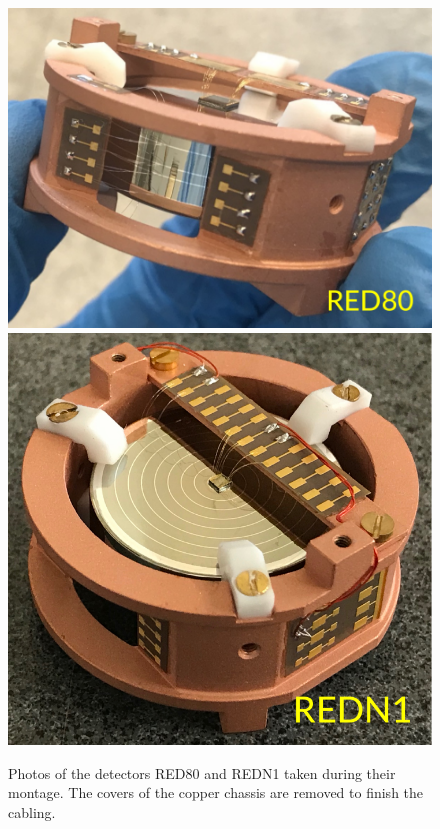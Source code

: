 \begin{figure}
\centering
\includegraphics[align=c, scale=0.5]{Figures/ElectrodesExperimental/photo_red80_v2.pdf}
\includegraphics[align=c, scale=0.5]{Figures/ElectrodesExperimental/photo_redn1_v2.pdf}
\caption{Photos of the detectors RED80 and REDN1 taken during their montage. The covers of the copper chassis are removed to finish the cabling.}
\label{fig:photo-redn1-red80}
\end{figure}


